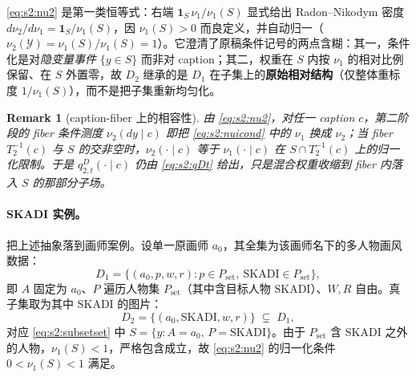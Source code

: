 \documentclass[11pt,a4paper]{article}
\newtheorem{remark}[theorem]{Remark}
\newcommand{\cY}{\mathcal{Y}}
\begin{document}
\eqref{eq:s2:nu2} 是第一类恒等式：右端 $\mathbf{1}_S\,\nu_1/\nu_1(S)$ 显式给出 Radon--Nikodym 密度 $d\nu_2/d\nu_1=\mathbf{1}_S/\nu_1(S)$，因 $\nu_1(S)>0$ 而良定义，并自动归一（$\nu_2(\cY)=\nu_1(S)/\nu_1(S)=1$）。它澄清了原稿条件记号的两点含糊：其一，条件化是对\emph{隐变量事件} $\{y\in S\}$ 而非对 caption；其二，权重在 $S$ 内按 $\nu_1$ 的相对比例保留、在 $S$ 外置零，故 $D_2$ 继承的是 $D_1$ 在子集上的\textbf{原始相对结构}（仅整体重标度 $1/\nu_1(S)$），而不是把子集重新均匀化。

\begin{remark}[caption-fiber 上的相容性]\label{rem:s2:fibercompat}
由 \eqref{eq:s2:nu2}，对任一 caption $c$，第二阶段的 fiber 条件测度 $\nu_2(dy\mid c)$ 即把 \eqref{eq:s2:nuicond} 中的 $\nu_1$ 换成 $\nu_2$；当 fiber $T_2^{-1}(c)$ 与 $S$ 的交非空时，$\nu_2(\cdot\mid c)$ 等于 $\nu_1(\cdot\mid c)$ 在 $S\cap T_2^{-1}(c)$ 上的归一化限制。于是 $q_{2,t}^D(\cdot\mid c)$ 仍由 \eqref{eq:s2:qDt} 给出，只是混合权重收缩到 fiber 内落入 $S$ 的那部分子场。
\end{remark}

\paragraph{SKADI 实例。} 把上述抽象落到画师案例。设单一原画师 $a_0$，其全集为该画师名下的多人物画风数据：
\begin{equation}\label{eq:s2:D1skadi}
D_1=\bigl\{(a_0,p,w,r):p\in P_{\mathrm{set}},\ \mathrm{SKADI}\in P_{\mathrm{set}}\bigr\},
\end{equation}
即 $A$ 固定为 $a_0$、$P$ 遍历人物集 $P_{\mathrm{set}}$（其中含目标人物 $\mathrm{SKADI}$）、$W,R$ 自由。真子集取为其中 $\mathrm{SKADI}$ 的图片：
\begin{equation}\label{eq:s2:D2skadi}
D_2=\bigl\{(a_0,\mathrm{SKADI},w,r)\bigr\}\;\subsetneq\;D_1,
\end{equation}
对应 \eqref{eq:s2:subsetset} 中 $S=\{y:A=a_0,\,P=\mathrm{SKADI}\}$。由于 $P_{\mathrm{set}}$ 含 $\mathrm{SKADI}$ 之外的人物，$\nu_1(S)<1$，严格包含成立，故 \eqref{eq:s2:nu2} 的归一化条件 $0<\nu_1(S)<1$ 满足。
\end{document}
